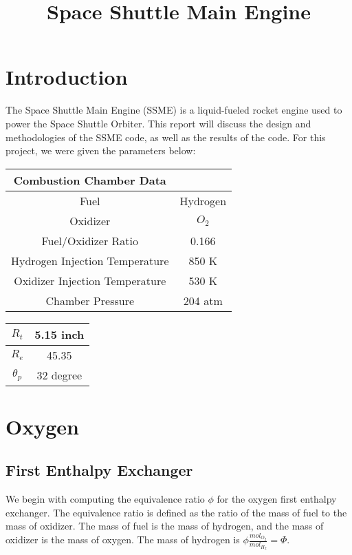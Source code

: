 \documentclass[12pt, Times New Roman]{article}
\title{Space Shuttle Main Engine}
\begin{document}
    \maketitle
    
    \tableofcontents

    \section{Introduction}
    The Space Shuttle Main Engine (SSME) is a liquid-fueled rocket engine used to power the Space Shuttle Orbiter. 
    This report will discuss the design and methodologies of the SSME code, as well as the results of the code.
    For this project, we were given the parameters below:
    \begin{center}
        \begin{tabular}{|c|c|}
            \hline
            Combustion Chamber Data & \\
            \hline
            Fuel & Hydrogen \\
            \hline
            Oxidizer & $O_{2}$ \\
            \hline
            Fuel/Oxidizer Ratio & 0.166 \\
            \hline
            Hydrogen Injection Temperature & 850 K \\
            \hline
            Oxidizer Injection Temperature & 530 K \\
            \hline
            Chamber Pressure & 204 atm \\
            \hline
        \end{tabular}

        \vspace*{6pt}

        \begin{tabular}{|c|c|}
            \hline
            $R_{t}$ & 5.15 inch \\
            \hline
            $R_{e}$ & 45.35 \\
            \hline
            $\theta_{p}$ & 32 degree \\
            \hline
        \end{tabular}
    \end{center}

    \section{Oxygen}

    \subsection{First Enthalpy Exchanger}
    We begin with computing the equivalence ratio $\phi$  for the oxygen first enthalpy exchanger. 
    The equivalence ratio is defined as the ratio of the mass of fuel to the mass of oxidizer. 
    The mass of fuel is the mass of hydrogen, and the mass of oxidizer is the mass of oxygen. 
    The mass of hydrogen is $\phi \frac{mol_{O_{2}}}{mol_{H_{2}}} = \Phi$.
\end{document}
